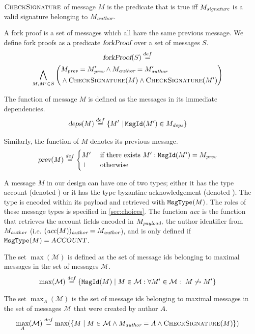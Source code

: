 \documentclass{article}
\begin{document}
$\textsc{CheckSignature}$ of message $M$ is the predicate that is true iff $M_\emph{signature}$ is a valid signature belonging to $M_\emph{author}$.

A fork proof is a set of messages which all have the same previous message. We define fork proofs as a predicate $\textsl{forkProof}$ over a set of messages $S$.
\begin{multline*}
    \forkproof(S) \definedas \\
    \hfill\bigwedge_{M, M' \in S} \left(
        \begin{aligned}
            &M_\emph{prev} = M'_\emph{prev}
            \land M_\emph{author} = M'_\emph{author} \\
            &\land \textsc{CheckSignature}(M)
            \land \textsc{CheckSignature}(M')
        \end{aligned}
    \right)
\end{multline*}

The function  of message $M$ is defined as the messages in its immediate dependencies.
\[\textsl{deps}(M) \stackrel{def}{=} \{M' \mid \texttt{MsgId}(M') \in M_\emph{deps}\}\]

Similarly, the function  of $M$ denotes its previous message.
\[\textsl{prev}(M) \stackrel{def}{=} \begin{cases}
    M' &\text{ if there exists } M' : \texttt{MsgId}(M') = M_\emph{prev}\\
    \bot & \text{ otherwise}
\end{cases} \]

A message $M$ in our design can have one of two types; either it has the type account (denoted ) or it has the type byzantine acknowledgement (denoted ). The type is encoded within its payload and retrieved with $\texttt{MsgType}(M)$. The roles of these message types is specified in \ref{sec:choices}. The function $\textit{acc}$ is the function that retrieves the account fields encoded in $M_\emph{payload}$, the author identifier from $M_\emph{author}$ (i.e. $(\textit{acc}(M))_\emph{author} = M_\emph{author}$), and is only defined if $\texttt{MsgType}(M) = \textsl{ACCOUNT}$.

The set $\max(\mathcal M)$ is defined as the set of message ids belonging to maximal messages in the set of messages $\mathcal M$.
\[
    \max(\mathcal M) \stackrel{def}{=} \{\texttt{MsgId}(M) \mid M \in \mathcal M : \forall M' \in \mathcal M : \ M \not\rightsquigarrow M' \}
\]

The set $\max_A(\mathcal M)$ is the set of message ids belonging to maximal messages in the set of messages $\mathcal M$ that were created by author $A$.
\[
    \max_A(\mathcal M) \stackrel{def}{=} \max(\{M \mid M \in \mathcal M \land M_\emph{author} = A \land \textsc{CheckSignature}(M)\})
\]
\end{document}
